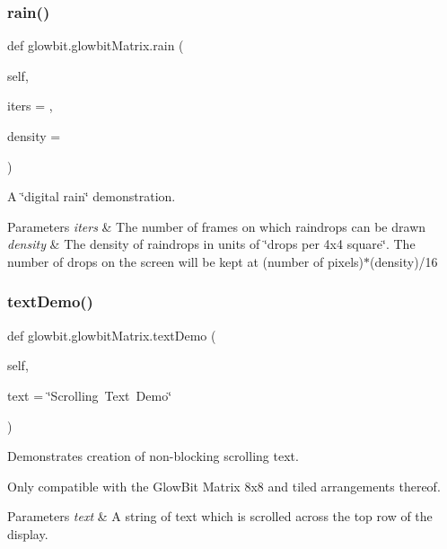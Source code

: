 \subsubsection{\texorpdfstring{rain()}{rain()}}
{\footnotesize\ttfamily def glowbit.\+glowbit\+Matrix.\+rain (\begin{DoxyParamCaption}\item[{}]{self,  }\item[{}]{iters = {},  }\item[{}]{density = {} }\end{DoxyParamCaption})}



A \char`\"{}digital rain\char`\"{} demonstration. 


\begin{DoxyParams}{Parameters}
{\em iters} & The number of frames on which raindrops can be drawn \\
\hline
{\em density} & The density of raindrops in units of \char`\"{}drops per 4x4 square\char`\"{}. The number of drops on the screen will be kept at (number of pixels)$\ast$(density)/16 \\
\hline
\end{DoxyParams}
\mbox{\label{classglowbit_1_1glowbitMatrix_a6232220b12c86c7ec361cde374419ac4}} 
\subsubsection{\texorpdfstring{text\+Demo()}{textDemo()}}
{\footnotesize\ttfamily def glowbit.\+glowbit\+Matrix.\+text\+Demo (\begin{DoxyParamCaption}\item[{}]{self,  }\item[{}]{text = {\ttfamily \char`\"{}Scrolling~Text~Demo\char`\"{}} }\end{DoxyParamCaption})}



Demonstrates creation of non-\/blocking scrolling text. 

Only compatible with the Glow\+Bit Matrix 8x8 and tiled arrangements thereof.


\begin{DoxyParams}{Parameters}
{\em text} & A string of text which is scrolled across the top row of the display. \\
\hline
\end{DoxyParams}
\mbox{\label{classglowbit_1_1glowbitMatrix_a0d44976cdc12728d9ae80c2d901029c0}} 
